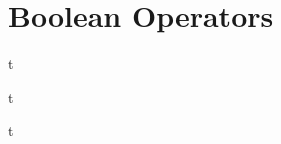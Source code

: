 \documentclass[../lecture2-variablesandcontrolstructures.tex]{subfiles}
\begin{document}
\section{Boolean Operators}


\begin{frame}[fragile]{}
t
\end{frame}


\begin{frame}[fragile]{}
t
\end{frame}


\begin{frame}[fragile]{}
t
\end{frame}

\end{document}
